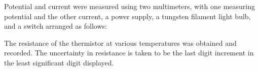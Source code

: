 \begin{paper}
	Potential and current were measured using two multimeters, with one measuring potential and the other current, a power supply, a tungsten filament light bulb, and a switch arranged as follows:
	
	

	The resistance of the thermistor at various temperatures was obtained and recorded. The uncertainty in resistance is taken to be the last digit increment in the least significant digit displayed.
	
\end{paper}
